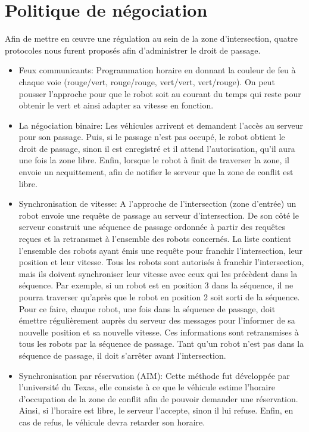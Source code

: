 \documentclass[french,a4paper,12pt]{report}
\begin{document}
\chapter{Politique de négociation}
Afin de mettre en œuvre une régulation au sein de la zone d'intersection, quatre protocoles nous furent proposés
afin d'administrer le droit de passage.

\begin{itemize}
\item Feux communicants:
Programmation horaire en donnant la couleur de feu à chaque voie (rouge/vert, rouge/rouge, vert/vert, vert/rouge).
On peut pousser l'approche pour que le robot soit au courant du temps qui reste pour obtenir le vert et ainsi adapter sa vitesse en fonction.

\item La négociation binaire:
Les véhicules arrivent et demandent l'accès au serveur pour son passage.
Puis, si le passage n'est pas occupé, le robot obtient le droit de passage, sinon il est enregistré et il attend l'autorisation, qu'il aura une fois la zone libre.
Enfin, lorsque le robot à finit de traverser la zone, il envoie un acquittement, afin de notifier le serveur que la zone de conflit est libre.

\item Synchronisation de vitesse:
A l’approche de l'intersection (zone d’entrée) un robot envoie une requête de passage au serveur d’intersection.
De son côté le serveur construit une séquence de passage ordonnée à partir des requêtes reçues et la retransmet
à l’ensemble des robots concernés. La liste contient l’ensemble des robots ayant émis une requête pour franchir
l’intersection, leur position et leur vitesse. Tous les robots sont autorisés à franchir l’intersection, mais ils doivent synchroniser leur vitesse avec ceux qui les précèdent dans la séquence. Par exemple, si un robot est en position 3 dans la séquence, il ne pourra traverser qu’après que le robot en position 2 soit sorti de la séquence. Pour ce faire, chaque robot, une fois dans la séquence de passage, doit émettre régulièrement auprès du serveur des messages pour l’informer de sa nouvelle position et sa nouvelle vitesse. Ces informations sont retransmises à
tous les robots par la séquence de passage. Tant qu’un robot n’est pas dans la séquence de passage, il doit s’arrêter avant l’intersection.

\item Synchronisation par réservation (AIM):
Cette méthode fut développée par l'université du Texas, elle consiste à ce que le véhicule estime l'horaire d'occupation de la zone de conflit afin de pouvoir demander une réservation.
Ainsi, si l'horaire est libre, le serveur l'accepte, sinon il lui refuse.
Enfin, en cas de refus, le véhicule devra retarder son horaire.
\end{itemize}
\end{document}
